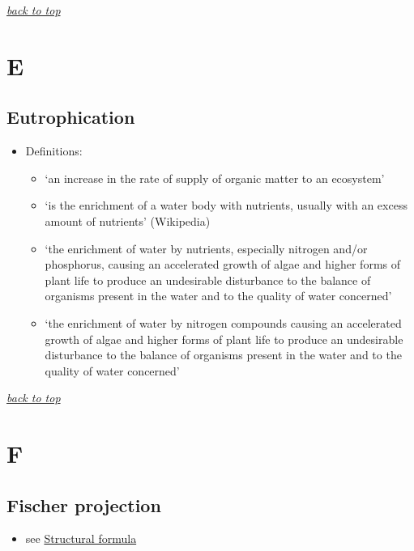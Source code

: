 \documentclass[]{book}
\providecommand{\tightlist}{%
  \setlength{\itemsep}{0pt}\setlength{\parskip}{0pt}}
\theoremstyle{definition}
\theoremstyle{definition}
\theoremstyle{definition}
\theoremstyle{remark}
\begin{document}
\emph{\protect\hyperlink{top}{back to top}}

\section{E}\label{e}

\hypertarget{eutrophication}{\subsection{Eutrophication}\label{eutrophication}}

\begin{itemize}
\tightlist
\item
  Definitions:

  \begin{itemize}
  \tightlist
  \item
    `an increase in the rate of supply of organic matter to an
    ecosystem' \citep{Nixon1995-th}
  \item
    `is the enrichment of a water body with nutrients, usually with an
    excess amount of nutrients' (Wikipedia)
  \item
    `the enrichment of water by nutrients, especially nitrogen and/or
    phosphorus, causing an accelerated growth of algae and higher forms
    of plant life to produce an undesirable disturbance to the balance
    of organisms present in the water and to the quality of water
    concerned' \citep{Anonymous1991-ho}
  \item
    `the enrichment of water by nitrogen compounds causing an
    accelerated growth of algae and higher forms of plant life to
    produce an undesirable disturbance to the balance of organisms
    present in the water and to the quality of water concerned'
    \citep{Anonymous1991-xb}
  \end{itemize}
\end{itemize}

\emph{\protect\hyperlink{top}{back to top}}

\section{F}\label{f}

\subsection{Fischer projection}\label{fischer-projection}

\begin{itemize}
\tightlist
\item
  see \protect\hyperlink{structural-formula}{Structural formula}
\end{itemize}
\end{document}
